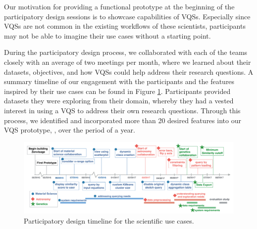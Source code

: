Our motivation for providing a functional prototype at the beginning of the participatory design sessions is to showcase capabilities of VQSs. Especially since VQSs are not common in the existing workflows of these scientists, participants may not be able to imagine their use cases without a starting point.
\par During the participatory design process, we collaborated with each of the teams closely with an average of two meetings per month, where we learned about their datasets, objectives, and how VQSs could help address their research questions. A summary timeline of our engagement with the participants and the features inspired by their use cases can be found in Figure \ref{timeline}. Participants provided datasets they were exploring from their domain, whereby they had a vested interest in using a VQS to address their own research questions. Through this process, we identified and incorporated more than 20 desired features into our VQS prototype, \zv, over the period of a year.
\begin{figure}[!ht]
	\centering
	\captionsetup{justification=centering,margin=2cm}
	\vspace{-10pt}
	\includegraphics[width=6in]{figures/timeline_new.pdf}
	\vspace{-6pt}\caption{Participatory design timeline for the scientific use cases.}
	\label{timeline}
	\vspace{-10pt}
\end{figure}